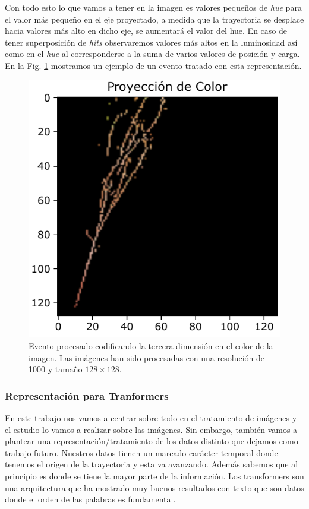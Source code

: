 \documentclass[a4paper,12pt,twoside,titlepage]{article}
\begin{document}
Con todo esto lo que vamos a tener en la imagen es valores pequeños de \textit{hue} para el valor más pequeño en el eje proyectado, a medida que la trayectoria se desplace hacia valores más alto en dicho eje, se aumentará el valor del hue. En caso de tener superposición de \textit{hits} observaremos valores más altos en la luminosidad así como en el \textit{hue} al corresponderse a la suma de varios valores de posición y carga. En la Fig. \ref{fig:proy_color} mostramos un ejemplo de un evento tratado con esta representación.

\begin{figure}[h!]
  \centering
  \includegraphics[scale=0.85]{proyeccion_color.pdf}
  \caption{Evento procesado codificando la tercera dimensión en el color de la imagen. Las imágenes han sido procesadas con una resolución de 1000 y tamaño $128\times128$.}
  \label{fig:proy_color}
\end{figure}

\subsubsection*{Representación para Tranformers}

En este trabajo nos vamos a centrar sobre todo en el tratamiento de imágenes y el estudio lo vamos a realizar sobre las imágenes. Sin embargo, también vamos a plantear una representación/tratamiento de los datos distinto que dejamos como trabajo futuro. Nuestros datos tienen un marcado carácter temporal donde tenemos el origen de la trayectoria y esta va avanzando. Además sabemos que al principio es donde se tiene la mayor parte de la información. Los transformers son una arquitectura que ha mostrado muy buenos resultados con texto que son datos donde el orden de las palabras es fundamental. 
\end{document}

